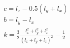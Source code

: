 \documentclass[12pt]{article}
\begin{document}
\begin{eqnarray*}
 c = l_z - 0.5(l_y+l_x) \\
 b = l_y - l_x \\
 k = \frac{3}{2} \frac{l_x^2+l_y^2+l_z^2}{(l_x+l_y+l_z)^2} - \frac{1}{2} 
\end{eqnarray*}
\end{document}
